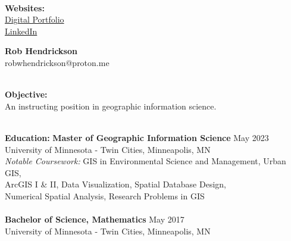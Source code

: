 \documentclass[letterpaper,12pt]{article}
\numberwithin{equation}{section}
\begin{document}
\pagestyle{empty}

	\begin{multicols}{3}
		\begin{center}
			~\\
			\textbf{Websites:}\\
			\href{https://rwhendrickson.github.io/Portfolio/}{Digital Portfolio}\\
			\href{https://www.linkedin.com/in/~rwhendrickson/}{LinkedIn}\\
		\end{center}
		\columnbreak
		\begin{center}
			{\large\textbf{Rob Hendrickson}}\\
			{\small robwhendrickson@proton.me} \\
		\end{center}
		\columnbreak
		\begin{center}
		~\\
			\textbf{Objective:}\\
			An instructing position in geographic information science.
		\end{center}
	\end{multicols}
 \vspace{-.1in}
 \noindent\makebox[\linewidth]{\rule{\linewidth}{0.4pt}}
	~\\
\textbf{Education:} \hspace*{.2in} \textbf{Master of Geographic Information Science} \hspace*{1.99in} May 2023\\
	\hspace*{1.16in} University of Minnesota - Twin Cities, Minneapolis, MN\\
	\hspace*{1.16in} \textit{Notable Coursework:} GIS in Environmental Science and Management, Urban GIS,\\
	\hspace*{2.72in} ArcGIS I \& II, Data Visualization, Spatial Database Design,\\ \hspace*{2.72in} Numerical Spatial Analysis, Research Problems in GIS
	\\\\
 \hspace*{1.16in} \textbf{Bachelor of Science, Mathematics} \hspace*{2.69in} May 2017\\
	\hspace*{1.16in} University of Minnesota - Twin Cities, Minneapolis, MN\\
\end{document}
